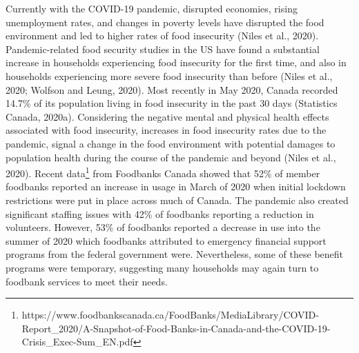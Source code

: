 \documentclass[]{elsarticle} %
\begin{document}
Currently with the COVID-19 pandemic, disrupted economies, rising
unemployment rates, and changes in poverty levels have disrupted the
food environment and led to higher rates of food insecurity (Niles et
al., 2020). Pandemic-related food security studies in the US have found
a substantial increase in households experiencing food insecurity for
the first time, and also in households experiencing more severe food
insecurity than before (Niles et al., 2020; Wolfson and Leung, 2020).
Most recently in May 2020, Canada recorded 14.7\% of its population
living in food insecurity in the past 30 days (Statistics Canada,
2020a). Considering the negative mental and physical health effects
associated with food insecurity, increases in food insecurity rates due
to the pandemic, signal a change in the food environment with potential
damages to population health during the course of the pandemic and
beyond (Niles et al., 2020). Recent data\footnote{https://www.foodbankscanada.ca/FoodBanks/MediaLibrary/COVID-Report\_2020/A-Snapshot-of-Food-Banks-in-Canada-and-the-COVID-19-Crisis\_Exec-Sum\_EN.pdf}
from Foodbanks Canada showed that 52\% of member foodbanks reported an
increase in usage in March of 2020 when initial lockdown restrictions
were put in place across much of Canada. The pandemic also created
significant staffing issues with 42\% of foodbanks reporting a reduction
in volunteers. However, 53\% of foodbanks reported a decrease in use
into the summer of 2020 which foodbanks attributed to emergency
financial support programs from the federal government were.
Nevertheless, some of these benefit programs were temporary, suggesting
many households may again turn to foodbank services to meet their needs.
\end{document}
